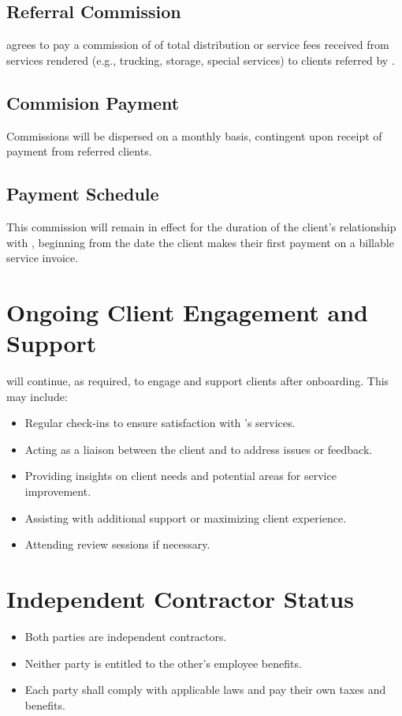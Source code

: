 \documentclass[12pt]{article}
\begin{document}
\subsection{Referral Commission}
\partyBshort{} agrees to pay \partyAshort{} a commission of \commissionRate{} of total distribution or service fees received from services rendered (e.g., trucking, storage, special services) to clients referred by \partyAshort{}. 

\subsection{Commision Payment}
Commissions will be dispersed on a monthly basis, contingent upon receipt of payment from referred clients.

\subsection{Payment Schedule}
This commission will remain in effect for the duration of the client’s relationship with \textbf{\partyBshort}, beginning from the date the client makes their first payment on a billable service invoice.

\section{Ongoing Client Engagement and Support}
\partyAshort{} will continue, as required, to engage and support clients after onboarding. This may include:
\begin{itemize}
  \item Regular check-ins to ensure satisfaction with \partyBshort{}’s services.
  \item Acting as a liaison between the client and \partyBshort{} to address issues or feedback.
  \item Providing insights on client needs and potential areas for service improvement.
  \item Assisting with additional support or maximizing client experience.
  \item Attending review sessions if necessary.
\end{itemize}

\section{Independent Contractor Status}
\begin{itemize}
  \item Both parties are independent contractors.
  \item Neither party is entitled to the other’s employee benefits.
  \item Each party shall comply with applicable laws and pay their own taxes and benefits.
\end{itemize}
\end{document}
